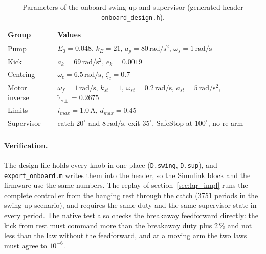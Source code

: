 \documentclass[a4paper,11pt]{article}
\begin{document}
\begin{table}[h]
\centering
\caption[Parameters of the onboard swing-up and supervisor]{Parameters of the onboard swing-up and supervisor (generated header \texttt{onboard\_design.h}).}
\label{tab:su_impl}
\small
\begin{tabular}{@{}ll@{}}
\toprule
Group & Values \\
\midrule
Pump & $E_0 = 0.048$, $k_E = 21$, $a_p = 80\,\mathrm{rad/s^2}$, $\omega_s = 1\,\mathrm{rad/s}$ \\
Kick & $a_k = 69\,\mathrm{rad/s^2}$, $e_k = 0.0019$ \\
Centring & $\omega_c = 6.5\,\mathrm{rad/s}$, $\zeta_c = 0.7$ \\
Motor inverse & $\omega_f = 1\,\mathrm{rad/s}$, $k_{st} = 1$, $\omega_{st} = 0.2\,\mathrm{rad/s}$, $a_{st} = 5\,\mathrm{rad/s^2}$, $\tilde\tau_{s\pm} = 0.2675$ \\
Limits & $i_{max} = 1.0$\,A, $d_{max} = 0.45$ \\
Supervisor & catch $20^\circ$ and $8\,\mathrm{rad/s}$, exit $35^\circ$, SafeStop at $100^\circ$, no re-arm \\
\bottomrule
\end{tabular}
\end{table}

\paragraph{Verification.} The design file holds every knob in one place (\texttt{D.swing}, \texttt{D.sup}), and \texttt{export\_onboard.m} writes them into the header, so the Simulink block and the firmware use the same numbers. The replay of section~\ref{sec:lqr_impl} runs the complete controller from the hanging rest through the catch (3751 periods in the swing-up scenario), and requires the same duty and the same supervisor state in every period. The native test also checks the breakaway feedforward directly: the kick from rest must command more than the breakaway duty plus 2\,\% and not less than the law without the feedforward, and at a moving arm the two laws must agree to $10^{-6}$.
\end{document}
